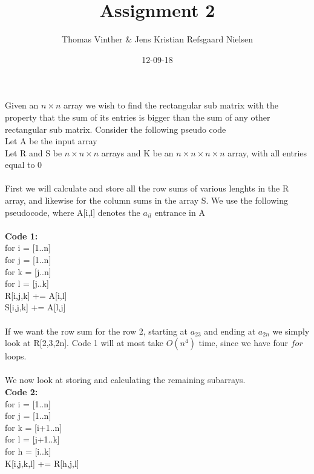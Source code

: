 \documentclass{article}
\theoremstyle{remark}
\numberwithin{equation}{section}
\begin{document}
	\author{Thomas Vinther \& Jens Kristian Refsgaard Nielsen}
	\title{Assignment 2}
	\date{12-09-18}
	\maketitle
\section*{}
Given an $n\times n$ array we wish to find the rectangular sub matrix with the property that the sum of its entries is bigger than the sum of any other rectangular sub matrix. Consider the following pseudo code\\
Let A be the input array \\
Let R and S be $n\times n\times n$ arrays and K be an $n\times n\times n\times n$ array, with all entries equal to $0$ \\
\\
First we will calculate and store all the row sums of various lenghts in the R array, and likewise for the column sums in the array S. We use the following pseudocode, where  A[i,l] denotes the $ a_{il} $ entrance in A\\
\\\textbf{Code 1:}
\\for i = [1..n]
\\\indent for j = [1..n]
\\\indent\indent for k = [j..n]
\\\indent\indent\indent for l = [j..k]
\\\indent\indent\indent\indent R[i,j,k] += A[i,l]
\\\indent\indent\indent\indent S[i,j,k] += A[l,j]
\\
\\If we want the row sum for the row 2, starting at $ a_{23} $ and ending at $ a_{2n} $ we simply look at R[2,3,2n]. Code 1 will at most take $ O(n^{4}) $ time, since we have four $ for $ loops. \\
\\We now look at storing and calculating the remaining subarrays. 
\\\textbf{Code 2:}
\\for i = [1..n]
\\\indent for j = [1..n]
\\\indent\indent for k = [i+1..n]
\\\indent\indent\indent for l = [j+1..k]
\\\indent\indent\indent\indent for h = [i..k]
\\\indent\indent\indent\indent\indent K[i,j,k,l] += R[h,j,l]
\end{document}
